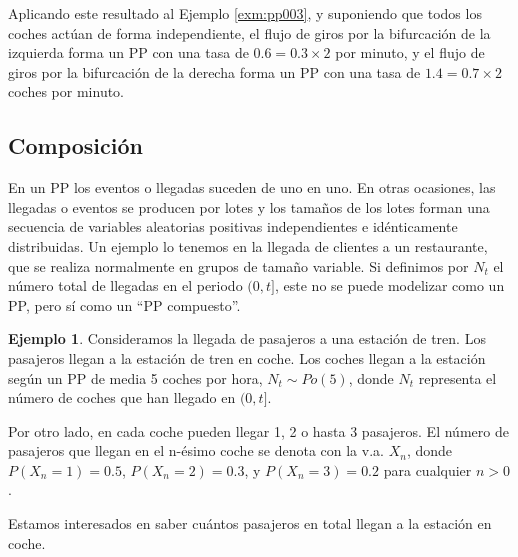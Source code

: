 \documentclass[
]{book}
\theoremstyle{definition}
\theoremstyle{definition}
\newtheorem{example}{Ejemplo}[chapter]
\theoremstyle{definition}
\theoremstyle{definition}
\theoremstyle{remark}
\begin{document}
Aplicando este resultado al Ejemplo \ref{exm:pp003}, y suponiendo que todos los coches actúan de forma independiente, el flujo de giros por la bifurcación de la izquierda forma un PP con una tasa de \(0.6=0.3\times 2\) por minuto, y el flujo de giros por la bifurcación de la derecha forma un PP con una tasa de \(1.4=0.7\times 2\) coches por minuto.

\hypertarget{composicion_pp}{%
\subsection{Composición}\label{composicion_pp}}

En un PP los eventos o llegadas suceden de uno en uno. En otras ocasiones, las llegadas o eventos se producen por lotes y los tamaños de los lotes forman una secuencia de variables aleatorias positivas independientes e idénticamente distribuidas. Un ejemplo lo tenemos en la llegada de clientes a un restaurante, que se realiza normalmente en grupos de tamaño variable. Si definimos por \(N_t\) el número total de llegadas en el periodo \((0,t]\), este no se puede modelizar como un PP, pero sí como un ``PP compuesto''.

\begin{example}
\protect\hypertarget{exm:pp004}{}\label{exm:pp004}Consideramos la llegada de pasajeros a una estación de tren. Los pasajeros llegan a la estación de tren en coche. Los coches llegan a la estación según un PP de media 5 coches por hora, \(N_t \sim Po(5)\), donde \(N_t\) representa el número de coches que han llegado en \((0,t]\).

Por otro lado, en cada coche pueden llegar 1, 2 o hasta 3 pasajeros. El número de pasajeros que llegan en el n-ésimo coche se denota con la v.a. \(X_n\), donde \(P(X_n = 1) = 0.5\), \(P(X_n = 2) = 0.3\), y \(P(X_n = 3) = 0.2\) para cualquier \(n>0\).

Estamos interesados en saber cuántos pasajeros en total llegan a la estación en coche.
\end{example}
\end{document}
